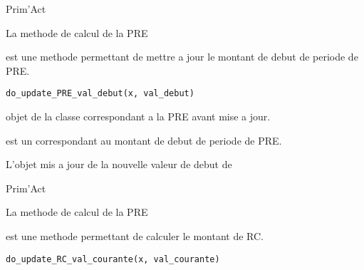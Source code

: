 \documentclass[a4paper]{book}
\begin{document}
%
\begin{Author}\relax
Prim'Act
\end{Author}
%
\begin{SeeAlso}\relax
La methode de calcul de la PRE 
\end{SeeAlso}
%
\begin{Description}\relax
{} est une methode permettant de mettre a jour le montant de debut de periode de PRE.
\end{Description}
%
\begin{Usage}
\begin{verbatim}
do_update_PRE_val_debut(x, val_debut)
\end{verbatim}
\end{Usage}
%
\begin{Arguments}
\begin{ldescription}
\item[\code{x}] objet de la classe  correspondant a la PRE avant mise a jour.

\item[\code{val\_debut}] est un  correspondant au montant de debut de periode de PRE.
\end{ldescription}
\end{Arguments}
%
\begin{Value}
L'objet  mis a jour de la nouvelle valeur de debut de 
\end{Value}
%
\begin{Author}\relax
Prim'Act
\end{Author}
%
\begin{SeeAlso}\relax
La methode de calcul de la PRE 
\end{SeeAlso}
%
\begin{Description}\relax
{} est une methode permettant de calculer le montant de RC.
\end{Description}
%
\begin{Usage}
\begin{verbatim}
do_update_RC_val_courante(x, val_courante)
\end{verbatim}
\end{Usage}
\end{document}
